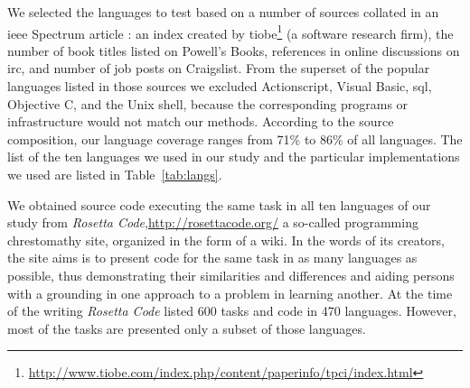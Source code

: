 \documentclass[10pt]{sigplanconf}
\begin{document}
We selected the languages to test based on a number of sources
collated in an {\sc ieee} Spectrum article \cite{Kin11}:
an index created by
{\sc tiobe}\footnote{\url{http://www.tiobe.com/index.php/content/paperinfo/tpci/index.html}} (a software research firm),
the number of book titles listed on Powell's Books,
references in online discussions on {\sc irc}, and
number of job posts on Craigslist.
From the superset of the popular languages listed in those
sources we excluded
Actionscript, Visual Basic, {\sc sql}, Objective C, and the Unix shell,
because the corresponding programs or infrastructure would not match our methods.
According to the source composition,
our language coverage ranges from 71\% to 86\% of all languages.
The list of the ten languages we used in our study and the
particular implementations we used are listed in
Table~\ref{tab:langs}.

We obtained source code executing the same task in all ten
languages of our study from {\em Rosetta Code},\url{http://rosettacode.org/}
a so-called programming chrestomathy site,
organized in the form of a wiki.
In the words of its creators,
the site aims is to present code for the same task in as many languages as possible,
thus demonstrating their similarities and differences and
aiding persons with a grounding in one approach to a problem in learning another.
At the time of the writing {\em Rosetta Code}
listed 600 tasks and code in 470 languages.
However, most of the tasks are presented only a subset of those languages.
\end{document}
